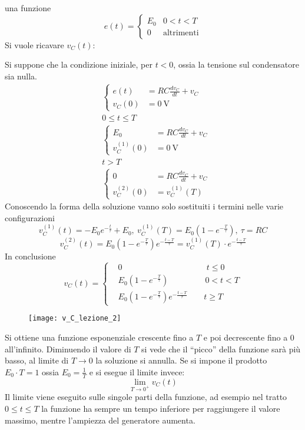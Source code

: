 una funzione 
$$
e(t) = \begin{cases}
E_0 & 0 < t < T\\
0 &\text{altrimenti}
\end{cases}
$$
Si vuole ricavare $v_C(t)$:

Si suppone che la condizione iniziale, per $t < 0 $, ossia la tensione sul condensatore sia nulla.
$$\begin{aligned}
&\begin{cases}
e(t) &= RC\frac{dv_C}{dt} + v_C \\
v_C(0) &= \SI{0}{\volt}
\end{cases}\\
&0 \leq t \leq T\\
&\begin{cases}
E_0 &= RC\frac{dv_C}{dt} + v_C \\
v_C^{(1)}(0) &= \SI{0}{\volt} 
\end{cases}\\
&t > T\\
&\begin{cases}
0 &= RC\frac{dv_C}{dt} + v_C \\
v_C^{(2)}(0) &= v_C^{(1)}(T) 
\end{cases}
\end{aligned}
$$
Conoscendo la forma della soluzione vanno solo sostituiti i termini nelle varie configurazioni
$$
v_C^{(1)}(t) = -E_0 e^{-\frac{t}{\tau}} + E_0,\ v_C^{(1)}(T) = E_0 \left(1-e^{-\frac{T}{\tau}}\right),\ \tau = RC
$$
$$
v_C^{(2)}(t) = E_0\left(1-e^{-\frac{T}{\tau}}\right) e^{-\frac{t-T}{\tau}} = v_C^{(1)}(T)\cdot e^{-\frac{t-T}{\tau}}
$$
In conclusione
$$
v_C(t) = \left\{
\begin{aligned}
&0 \qquad\qquad\qquad\qquad\qquad\ t\leq 0\\
&E_0 \left(1-e^{-\frac{T}{\tau}}\right) \qquad\qquad\ \ 0 < t < T\\
& E_0\left(1-e^{-\frac{T}{\tau}}\right) e^{-\frac{t-T}{\tau}} \qquad t \geq T
\end{aligned}\right.
$$
\begin{figure}[H]
\centering
\texttt{[image: v\_C\_lezione\_2]}
\end{figure}

Si ottiene una funzione esponenziale crescente fino a $T$ e poi decrescente fino a 0 all'infinito. 
Diminuendo il valore di $T$ si vede che il ``picco'' della funzione sarà più basso, al limite 
di $T \rightarrow 0$ la soluzione si annulla.
Se si impone il prodotto $E_0\cdot T = 1$ ossia $E_0 = \frac{1}{T}$ e si esegue il limite invece:
$$
\lim_{T\rightarrow0^+} v_C(t)
$$
Il limite viene eseguito sulle singole parti della funzione, ad esempio nel tratto $0\leq t \leq T$
la funzione ha sempre un tempo inferiore per raggiungere il valore massimo, mentre l'ampiezza
del generatore aumenta.

